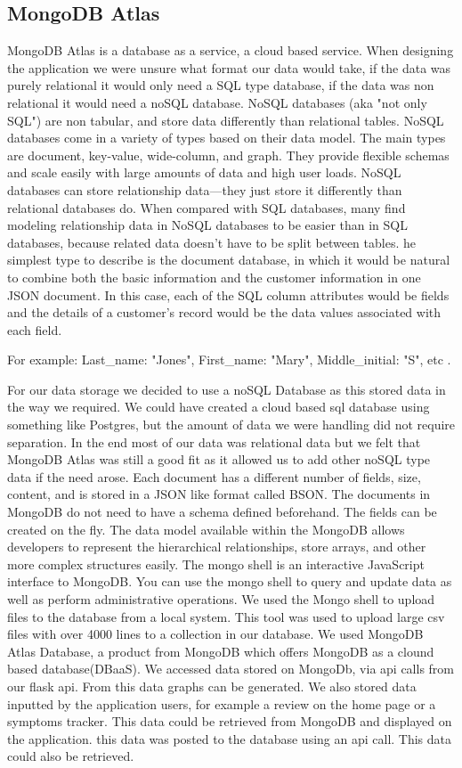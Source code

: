 \subsection{MongoDB Atlas}
MongoDB Atlas is a database as a service, a cloud based service.
When designing the application we were unsure what format our data would take, if the data was purely relational it would only need a SQL type database, if the data was non relational it would need a noSQL database.
NoSQL databases (aka "not only SQL") are non tabular, and store data differently than relational tables. NoSQL databases come in a variety of types based on their data model. The main types are document, key-value, wide-column, and graph. They provide flexible schemas and scale easily with large amounts of data and high user loads.  NoSQL databases can store relationship data—they just store it differently than relational databases do. When compared with SQL databases, many find modeling relationship data in NoSQL databases to be easier than in SQL databases, because related data doesn’t have to be split between tables. he simplest type to describe is the document database, in which it would be natural to combine both the basic information and the customer information in one JSON document. In this case, each of the SQL column attributes would be fields and the details of a customer’s record would be the data values associated with each field.\cite{mongodb}

For example: Last\_name: "Jones", First\_name: "Mary", Middle\_initial: "S", etc .

For our data storage we decided to use a noSQL Database as this stored data in the way we required. We could have created a cloud based sql database using something like Postgres, but the amount of data we were handling did not require separation.
In the end most of our data was relational data but we felt that MongoDB Atlas was still a good fit as it allowed us to add other noSQL type data if the need arose. Each document has a different number of fields, size, content, and is stored in a JSON like format called BSON. The documents in MongoDB do not need to have a schema defined beforehand. The fields can be created on the fly. The data model available within the MongoDB allows developers to represent the hierarchical relationships, store arrays, and other more complex structures easily.
The mongo shell is an interactive JavaScript interface to MongoDB. You can use the mongo shell to query and update data as well as perform administrative operations.\cite{mongodb}
We used the Mongo shell to upload files to the database from a local system. This tool was used to upload large csv files  with over 4000 lines to a collection in our database.
We used MongoDB Atlas Database, a product from MongoDB which offers MongoDB as a clound based database(DBaaS). We accessed data stored on MongoDb, via api calls from our flask api. From this data graphs can be generated. We also stored data inputted by the application users, for example a review on the home page or a symptoms tracker. This data could be retrieved from MongoDB and displayed on the application.
this data was posted to the database using an api call. This data could also be retrieved. 

